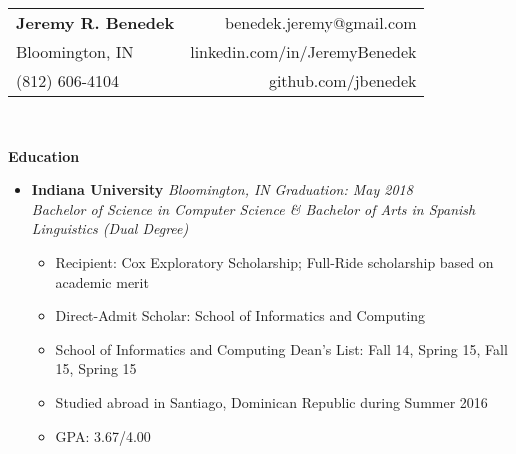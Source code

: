 \documentclass[letterpaper,11pt]{article}
\makeatletter
\newcommand{\resitem}[1]{\item #1 \vspace{-2pt}}
\newcommand{\resheading}[1]{{\large \colorbox{mygrey}{\begin{minipage}{\textwidth}{\textbf{#1 \vphantom{p\^{E}}}}\end{minipage}}}}
\newcommand{\edusubheading}[4]{
  \textbf{#1}   \textit{#2} \hspace*{\fill}  \textit{#3} 
      \\ \textit{#4}  \\
\vspace{-6pt}}
\makeatother
\begin{document}
  \newcommand{\mywebheader}{
    \begin{tabular*}{7in}{l@{\extracolsep{\fill}}r}
      \textbf{\LARGE Jeremy R. Benedek} & benedek.jeremy@gmail.com\\
      {\footnotesize \texttt{\colorbox{yellow}{[public web version:  address \& phone omitted]}}} & http://jeremybenedek.com \\
    \end{tabular*}
    \\
  \vspace{0.1in}}

  \newcommand{\myheader}{
    \begin{tabular*}{7in}{l@{\extracolsep{\fill}}r}
      \textbf{\huge Jeremy R. Benedek} & benedek.jeremy@gmail.com\\
      Bloomington, IN & linkedin.com/in/JeremyBenedek \\
    (812) 606-4104 & github.com/jbenedek	
    \end{tabular*}
    \\
  \vspace{0.1in}}


  \myheader

  \resheading{Education}
  \begin{itemize}
    \item
    \edusubheading{Indiana University}{Bloomington, IN}{Graduation: May 2018} 
    {Bachelor of Science in Computer Science \& Bachelor of Arts in Spanish Linguistics (Dual Degree)}  
    { \footnotesize
      \begin{itemize}
	  \resitem{Recipient: Cox Exploratory Scholarship; Full-Ride scholarship based on academic merit} 
	  \resitem{Direct-Admit Scholar: School of Informatics and Computing}
	  \resitem{School of Informatics and Computing Dean’s List: Fall 14, Spring 15, Fall 15, Spring 15}
	  \resitem{Studied abroad in Santiago, Dominican Republic during Summer 2016}
	  \resitem{GPA: 3.67/4.00} 
	\end{itemize}
      }
\end{itemize} %
\end{document}
